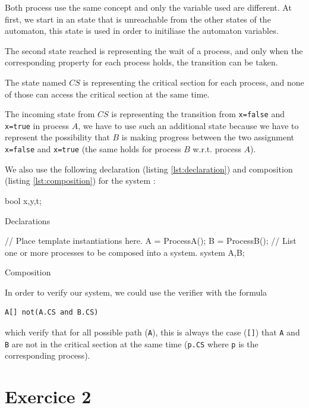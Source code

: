 \documentclass[a4paper,11pt]{report}
\begin{document}
Both process use the same concept and only the variable used are different. At
first, we start in an state that is unreachable from the other states of the
automaton, this state is used in order to initiliase the automaton variables.

The second state reached is representing the wait of a process, and only when
the corresponding property for each process holds, the transition can be taken.

The state named $CS$ is representing the critical section for each process, and
none of those can access the critical section at the same time.

The incoming state from $CS$ is representing the transition from \verb|x=false|
and \verb|x=true| in process $A$, we have to use such an additional state
because we have to represent the possibility that $B$ is making progress between
the two assignment \verb|x=false| and \verb|x=true| (the same holds for process
$B$ w.r.t. process $A$).

We also use the following declaration (listing \ref{lst:declaration}) and
composition (listing \ref{lst:composition}) for the system :

\begin{listing}[h]
  \centering
\begin{promelacode}
bool x,y,t;
\end{promelacode}
  \caption{Declarations}
  \label{lst:declaration}
\end{listing}

\begin{listing}[H]
\centering
\begin{promelacode}
// Place template instantiations here.
A = ProcessA();
B = ProcessB();
// List one or more processes to be composed into a system.
system A,B;
\end{promelacode}
\caption{Composition}
\label{lst:composition}
\end{listing}

In order to verify our system, we could use the verifier with the formula

\begin{verbatim}
A[] not(A.CS and B.CS)
\end{verbatim}

which verify that for all possible path (\verb|A|), this is always the case
(\verb|[]|) that \verb|A| and \verb|B| are not in the critical section at the
same time (\verb|p.CS| where \verb|p| is the corresponding process).

\section*{Exercice 2}
\end{document}
